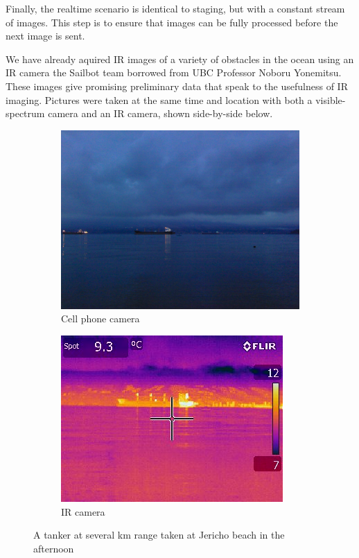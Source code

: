 Finally, the realtime scenario is identical to staging, but with a constant stream of images. This step is to ensure that images can be fully processed before the next image is sent.

We have already aquired IR images of a variety of obstacles in the ocean using an IR camera the Sailbot team borrowed from UBC Professor Noboru Yonemitsu. These images give promising preliminary data that speak to the usefulness of IR imaging. Pictures were taken at the same time and location with both a visible-spectrum camera and an IR camera, shown side-by-side below.

\begin{figure}
\centering
\begin{subfigure}{.5\textwidth}
  \centering
  \includegraphics[width=.8\linewidth]{"./image/jericho-evening-tanker-visible"}
  \caption{Cell phone camera}
  \label{fig:sub1}
\end{subfigure}%
\begin{subfigure}{.5\textwidth}
  \centering
  \includegraphics[width=.8\linewidth]{"./image/jericho-evening-tanker-ir"}
  \caption{IR camera}
  \label{fig:sub2}
\end{subfigure}
\caption{A tanker at several km range taken at Jericho beach in the afternoon}
\label{fig:IR comparison of a tanker in the afternoon}
\end{figure}
 
